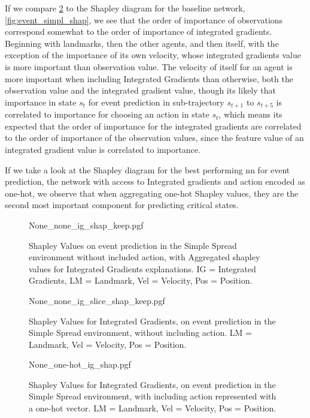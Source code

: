 \documentclass[UKenglish]{uiomasterthesis}
\begin{document}
If we compare \cref{fig:event_simpl_ig_slice} to the Shapley diagram for the baseline network, \cref{fig:event_simpl_shap}, we see that the order of importance of observations correspond somewhat to the order of importance of integrated gradients. Beginning with landmarks, then the other agents, and then itself, with the exception of the importance of its own velocity, whose integrated gradients value is more important than observation value.
The velocity of itself for an agent is more important when including Integrated Gradients than otherwise, both the observation value and the integrated gradient value, though its likely that importance in state $s_t$ for event prediction in sub-trajectory $s_{t+1}$ to $s_{t+5}$ is correlated to importance for choosing an action in state $s_t$, which means its expected that the order of importance for the integrated gradients are correlated to the order of importance of the observation values, since the feature value of an integrated gradient value is correlated to importance.

If we take a look at the Shapley diagram for the best performing \ac{nn} for event prediction, the network with access to Integrated gradients and action encoded as one-hot, we observe that when aggregating one-hot Shapley values, they are the second most important component for predicting critical states. 

\begin{figure}[H]
    \centering
{None_none_ig_shap_keep.pgf}
\caption{Shapley Values on event prediction in the Simple Spread environment without included action, with Aggregated shapley values for Integrated Gradients explanations. IG = Integrated Gradients, LM = Landmark, Vel = Velocity, Pos = Position.}
\label{fig:event_simpl_ig_shap}
\end{figure}

\begin{figure}[H]
\centering
{None_none_ig_slice_shap_keep.pgf}
\caption{Shapley Values for Integrated Gradients, on event prediction in the Simple Spread environment, without including action. LM = Landmark, Vel = Velocity, Pos = Position.}
\label{fig:event_simpl_ig_slice}
\end{figure}

\begin{figure}[H]
    \centering
{None_one-hot_ig_shap.pgf}
\caption{Shapley Values for Integrated Gradients, on event prediction in the Simple Spread environment, with including action represented with a one-hot vector. LM = Landmark, Vel = Velocity, Pos = Position.}
\label{fig:event_simpl_one-hot_ig_shap}
\end{figure}
\end{document}
